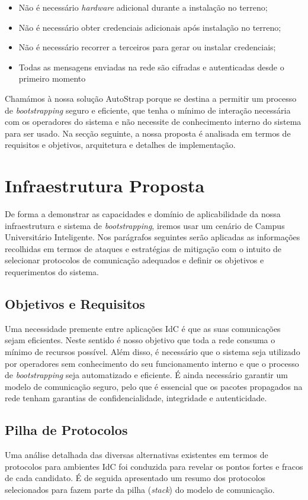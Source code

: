 \documentclass{llncs}
\begin{document}
\begin{itemize}
	\item{Não é necessário \textit{hardware} adicional durante a instalação no terreno};
	\item{Não é necessário obter credenciais adicionais após instalação no terreno};
	\item{Não é necessário recorrer a terceiros para gerar ou instalar credenciais};
	\item{Todas as mensagens enviadas na rede são cifradas e autenticadas desde o primeiro momento}
\end{itemize}
	
Chamámos à nossa solução AutoStrap porque se destina a permitir um processo de \textit{bootstrapping} seguro e eficiente, que tenha o mínimo de interação necessária com os operadores do sistema e não necessite de conhecimento interno do sistema para ser usado. 
Na secção seguinte, a nossa proposta é analisada em termos de requisitos e objetivos, arquitetura e detalhes de implementação.

\section{Infraestrutura Proposta}
\label{sec:proposed_infrastructure}
De forma a demonstrar as capacidades e domínio de aplicabilidade da nossa infraestrutura e sistema de \textit{bootstrapping}, iremos usar um cenário de Campus Universitário Inteligente. Nos parágrafos seguintes serão aplicadas as informações recolhidas em termos de ataques e estratégias de mitigação com o intuito de selecionar protocolos de comunicação adequados e definir os objetivos e requerimentos do sistema.

\subsection{Objetivos e Requisitos}
Uma necessidade premente entre aplicações \ac{IdC} é que as suas comunicações sejam eficientes.
Neste sentido é nosso objetivo que toda a rede consuma o mínimo de recursos possível. 
Além disso, é necessário que o sistema seja utilizado por operadores sem conhecimento do seu funcionamento interno e que o processo de \textit{bootstrapping} seja automatizado e eficiente. 
É ainda necessário garantir um modelo de comunicação seguro, pelo que é essencial que os pacotes propagados na rede tenham garantias de confidencialidade, integridade e autenticidade.

\subsection{Pilha de Protocolos}
\label{sec:protocol_stack}
Uma análise detalhada das diversas alternativas existentes em termos de protocolos para ambientes \ac{IdC} \cite{Al-Fuqaha2015} foi conduzida para revelar os pontos fortes e fracos de cada candidato. É de seguida apresentado um resumo dos protocolos selecionados para fazem parte da pilha (\textit{stack}) do modelo de comunicação.
\end{document}
